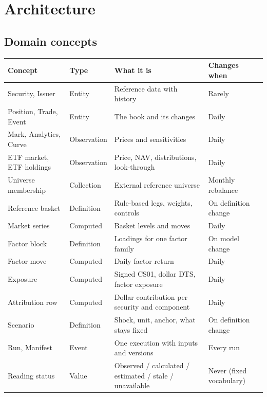 \documentclass[11pt,a4paper]{article}
\begin{document}
\section{Architecture}

\subsection{Domain concepts}
\begin{center}\small
\begin{tabularx}{\linewidth}{@{}llX l@{}}\toprule
Concept & Type & What it is & Changes when \\\midrule
Security, Issuer & Entity & Reference data with history & Rarely \\
Position, Trade, Event & Entity & The book and its changes & Daily \\
Mark, Analytics, Curve & Observation & Prices and sensitivities & Daily \\
ETF market, ETF holdings & Observation & Price, NAV, distributions, look-through & Daily \\
Universe membership & Collection & External reference universe & Monthly rebalance \\
Reference basket & Definition & Rule-based legs, weights, controls & On definition change \\
Market series & Computed & Basket levels and moves & Daily \\
Factor block & Definition & Loadings for one factor family & On model change \\
Factor move & Computed & Daily factor return & Daily \\
Exposure & Computed & Signed CS01, dollar DTS, factor exposure & Daily \\
Attribution row & Computed & Dollar contribution per security and component & Daily \\
Scenario & Definition & Shock, unit, anchor, what stays fixed & On definition change \\
Run, Manifest & Event & One execution with inputs and versions & Every run \\
Reading status & Value & Observed / calculated / estimated / stale / unavailable & Never (fixed vocabulary) \\\bottomrule
\end{tabularx}
\end{center}
\end{document}
